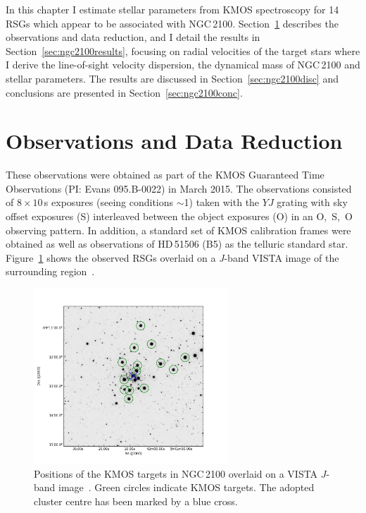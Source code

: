 In this chapter I estimate stellar parameters from KMOS spectroscopy for 14 RSGs which appear to be associated with NGC\,2100.
Section~\ref{sec:ngc2100obs} describes the observations and data reduction, and I detail the results in Section~\ref{sec:ngc2100results}, focusing on radial velocities of the target stars where I derive the line-of-sight velocity dispersion,
the dynamical mass of NGC\,2100 and stellar parameters.
The results are discussed in Section~\ref{sec:ngc2100disc} and conclusions are presented in Section~\ref{sec:ngc2100conc}.


\section{Observations and Data Reduction} %
\label{sec:ngc2100obs}
These observations were obtained as part of the KMOS Guaranteed Time Observations (PI: Evans 095.B-0022) in March 2015.
The observations consisted of $8\times10$\,s exposures (seeing conditions $\sim$1) taken with the $YJ$ grating with sky offset exposures (S) interleaved between the object exposures (O) in an O,~S,~O observing pattern.
In addition, a standard set of KMOS calibration frames were obtained as well as observations of HD\,51506 (B5) as the telluric standard star.
Figure~\ref{fig:targets} shows the observed RSGs overlaid on a {\it J}-band VISTA image of the surrounding region~\citep{2011A&A...527A.116C}.

\begin{figure}
\centering
 \includegraphics[width=0.65\textwidth]{ngc2100/NGC2100-targets}
 \caption[NGC\,2100 targets]{Positions of the KMOS targets in NGC\,2100 overlaid on a VISTA $J$-band image~\citep{2011A&A...527A.116C}.
          Green circles indicate KMOS targets.
          The adopted cluster centre has been marked by a blue cross.\label{fig:targets}
          }
\end{figure}

